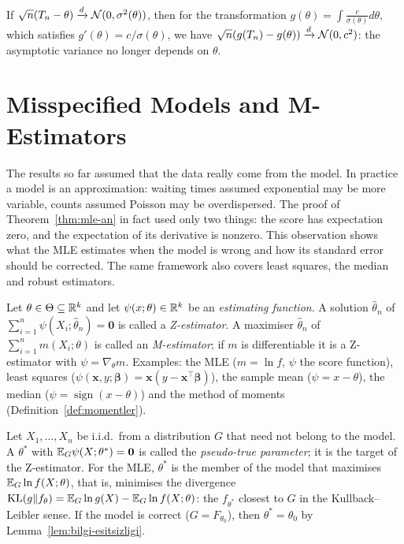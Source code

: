 \documentclass[main.tex]{subfiles}
\begin{document}
\begin{definition}
If $\sqrt n(T_n-\theta)\xrightarrow{d}\mathcal{N}(0,\sigma^2(\theta))$, then for the transformation $g(\theta)=\int\frac{c}{\sigma(\theta)}d\theta$, which satisfies $g'(\theta)=c/\sigma(\theta)$, we have $\sqrt n(g(T_n)-g(\theta))\xrightarrow{d}\mathcal{N}(0,c^2)$: the asymptotic variance no longer depends on $\theta$.
\end{definition}

\section{Misspecified Models and M-Estimators}

The results so far assumed that the data really come from the model. In practice a model is an approximation: waiting times assumed exponential may be more variable, counts assumed Poisson may be overdispersed. The proof of Theorem~\ref{thm:mle-an} in fact used only two things: the score has expectation zero, and the expectation of its derivative is nonzero. This observation shows what the MLE estimates when the model is wrong and how its standard error should be corrected. The same framework also covers least squares, the median and robust estimators.

\begin{definition}\label{def:z-tahmin}
Let $\theta\in\Theta\subseteq\mathbb{R}^k$ and let $\psi(x;\theta)\in\mathbb{R}^k$ be an \emph{estimating function}. A solution $\hat\theta_n$ of $\sum_{i=1}^n\psi(X_i;\hat\theta_n)=\mathbf 0$ is called a \emph{Z-estimator}. A maximiser $\hat\theta_n$ of $\sum_{i=1}^nm(X_i;\theta)$ is called an \emph{M-estimator}; if $m$ is differentiable it is a Z-estimator with $\psi=\nabla_\theta m$. Examples: the MLE ($m=\ln f$, $\psi$ the score function), least squares ($\psi(\mathbf x,y;\bm\beta)=\mathbf x(y-\mathbf x^\top\bm\beta)$), the sample mean ($\psi=x-\theta$), the median ($\psi=\operatorname{sign}(x-\theta)$) and the method of moments (Definition~\ref{def:momentler}).
\end{definition}

\begin{definition}\label{def:sozde-gercek}
Let $X_1,\dots,X_n$ be i.i.d.\ from a distribution $G$ that need not belong to the model. A $\theta^*$ with $\mathbb{E}_G\psi(X;\theta^*)=\mathbf 0$ is called the \emph{pseudo-true parameter}; it is the target of the Z-estimator. For the MLE, $\theta^*$ is the member of the model that maximises $\mathbb{E}_G\ln f(X;\theta)$, that is, minimises the divergence $\mathrm{KL}(g\|f_\theta)=\mathbb{E}_G\ln g(X)-\mathbb{E}_G\ln f(X;\theta)$: the $f_{\theta^*}$ closest to $G$ in the Kullback--Leibler sense. If the model is correct ($G=F_{\theta_0}$), then $\theta^*=\theta_0$ by Lemma~\ref{lem:bilgi-esitsizligi}.
\end{definition}
\end{document}
